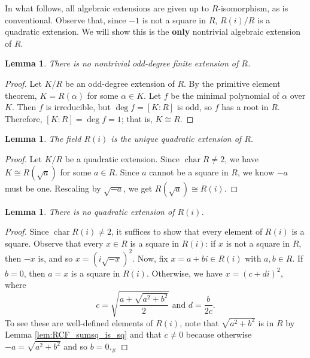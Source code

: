 \documentclass[a4paper]{report}
\newtheorem{lemma}[theorem]{Lemma}
\theoremstyle{definition}
\DeclareMathOperator{\ch}{char}
\begin{document}
In what follows, all algebraic extensions are given up to $R$-isomorphism, as is conventional. Observe that, since $-1$ is not a square in $R$, $R(i)/R$ is a quadratic extension. We will show this is the \textbf{only} nontrivial algebraic extension of $R$.

\begin{lemma}
  \label{lem:alg_ext_odd_deg}
  There is no nontrivial odd-degree finite extension of $R$.
\end{lemma}
\begin{proof}
  Let $K/R$ be an odd-degree extension of $R$. By the primitive element theorem, $K=R(\alpha)$ for some $\alpha\in K$. Let $f$ be the minimal polynomial of $\alpha$ over $K$. Then $f$ is irreducible, but $\deg f=[K:R]$ is odd, so $f$ has a root in $R$. Therefore, $[K:R]=\deg f=1$; that is, $K\cong R$.
\end{proof}

\begin{lemma}
  \label{lem:ext_deg_2}
  The field $R(i)$ is the unique quadratic extension of $R$.
\end{lemma}
\begin{proof}
  Let $K/R$ be a quadratic extension. Since $\ch R\neq2$, we have $K\cong R(\sqrt{a})$ for some $a\in R$. Since $a$ cannot be a square in $R$, we know $-a$ must be one. Rescaling by $\sqrt{-a}$, we get $R(\sqrt{a})\cong R(i)$.
\end{proof}

\begin{lemma}
  \label{lem:Ri_ext_deg_2}
  There is no quadratic extension of $R(i)$.
\end{lemma}
\begin{proof}
  Since $\operatorname{char}R(i)\neq 2$, it suffices to show that every element of $R(i)$ is a square. Observe that every $x\in R$ is a square in $R(i)$: if $x$ is not a square in $R$, then $-x$ is, and so $x=(i\sqrt{-x})^2$. Now, fix $x=a+bi\in R(i)$ with $a,b\in R$. If $b=0$, then $a=x$ is a square in $R(i)$. Otherwise, we have $x=(c+di)^2$, where
  \[c=\sqrt{\frac{a+\sqrt{a^2+b^2}}{2}}\text{ and }d=\frac{b}{2c}.\]
  To see these are well-defined elements of $R(i)$, note that $\sqrt{a^2+b^2}$ is in $R$ by Lemma \ref{lem:RCF_sumsq_is_sq} and that $c\neq0$ because otherwise $-a=\sqrt{a^2+b^2}$ and so $b=0$.$_\#$
\end{proof}
\end{document}
